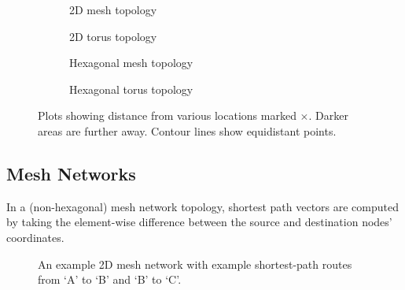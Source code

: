 		\begin{figure}
			\center
			
			\begin{subfigure}{\linewidth}
				\center
				\caption{2D mesh topology}
				\label{fig:distance-map-mesh}
			\end{subfigure}
			
			\vspace{1em}
			
			\begin{subfigure}{\linewidth}
				\center
				\caption{2D torus topology}
				\label{fig:distance-map-torus}
			\end{subfigure}
			
			\vspace{1em}
			
			\begin{subfigure}{\linewidth}
				\center
				\caption{Hexagonal mesh topology}
				\label{fig:distance-map-hex-mesh}
			\end{subfigure}
			
			\vspace{1em}
			
			\begin{subfigure}{\linewidth}
				\center
				\caption{Hexagonal torus topology}
				\label{fig:distance-map-hex-torus}
			\end{subfigure}
			
			\caption{Plots showing distance from various locations marked
			         {\color{red}$\times$}. Darker areas are further away. Contour
			         lines show equidistant points.}
			\label{fig:distance-map}
		\end{figure}
		
		\subsection{Mesh Networks}
			
			In a (non-hexagonal) mesh network topology, shortest path vectors are
			computed by taking the element-wise difference between the source and
			destination nodes' coordinates.
			
			\begin{figure}
				\center
				\caption{An example 2D mesh network with example shortest-path routes
				from `A' to `B' and `B' to `C'.}
				\label{fig:mesh-topology-coordinates}
			\end{figure}
			
